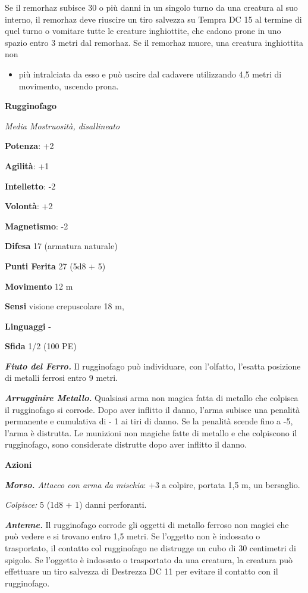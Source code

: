 \begin{multicols}{2}
Se il remorhaz subisce 30 o più danni in un singolo turno da una
creatura al suo interno, il remorhaz deve riuscire un tiro salvezza su Tempra DC 15 al termine di quel turno o vomitare tutte le creature
inghiottite, che cadono prone in uno spazio entro 3 metri dal remorhaz.
Se il remorhaz muore, una creatura inghiottita non


\begin{itemize}
\item
  più intralciata da esso e può uscire dal cadavere utilizzando 4,5
  metri di movimento, uscendo prona.
\end{itemize}

\textbf{Rugginofago}

\emph{Media Mostruosità, disallineato}

\textbf{Potenza}: +2

\textbf{Agilità}: +1

\textbf{Intelletto}: -2

\textbf{Volontà}: +2

\textbf{Magnetismo}: -2

\textbf{Difesa} 17 (armatura naturale)

\textbf{Punti Ferita} 27 (5d8 + 5)

\textbf{Movimento} 12 m

\textbf{Sensi} visione crepuscolare 18 m, 

\textbf{Linguaggi} -

\textbf{Sfida} 1/2 (100 PE)

\emph{\textbf{Fiuto del Ferro.}} Il rugginofago può individuare, con
l'olfatto, l'esatta posizione di metalli ferrosi entro 9 metri.

\emph{\textbf{Arrugginire Metallo.}} Qualsiasi arma non magica fatta di
metallo che colpisca il rugginofago si corrode. Dopo aver inflitto il
danno, l'arma subisce una penalità permanente e cumulativa di - 1 ai
tiri di danno. Se la penalità scende fino a -5, l'arma è distrutta. Le
munizioni non magiche fatte di metallo e che colpiscono il rugginofago,
sono considerate distrutte dopo aver inflitto il danno.

\textbf{Azioni}

\emph{\textbf{Morso.} Attacco con arma da mischia}: +3 a colpire,
portata 1,5 m, un bersaglio.

\emph{Colpisce:} 5 (1d8 + 1) danni perforanti.

\emph{\textbf{Antenne.}} Il rugginofago corrode gli oggetti di metallo
ferroso non magici che può vedere e si trovano entro 1,5 metri. Se
l'oggetto non è indossato o trasportato, il contatto col rugginofago ne
distrugge un cubo di 30 centimetri di spigolo. Se l'oggetto è indossato
o trasportato da una creatura, la creatura può effettuare un tiro
salvezza di Destrezza DC 11 per evitare il contatto con il rugginofago.


\end{multicols}
